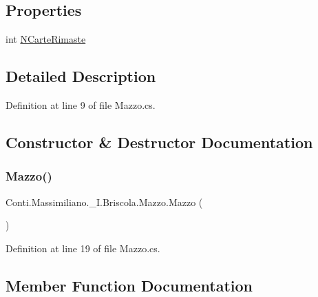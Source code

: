 \subsection*{Properties}
\begin{DoxyCompactItemize}
\item 
int \hyperlink{class_conti_1_1_massimiliano_1_1__5_i_1_1_briscola_1_1_mazzo_a2cf98bbfe46e4629a31e1a426c78eaf7}{N\+Carte\+Rimaste}
\end{DoxyCompactItemize}


\subsection{Detailed Description}


Definition at line 9 of file Mazzo.\+cs.



\subsection{Constructor \& Destructor Documentation}
\hypertarget{class_conti_1_1_massimiliano_1_1__5_i_1_1_briscola_1_1_mazzo_a14ec4b325dde5c862a8445d9b92a46e4}{}\label{class_conti_1_1_massimiliano_1_1__5_i_1_1_briscola_1_1_mazzo_a14ec4b325dde5c862a8445d9b92a46e4} 
\subsubsection{\texorpdfstring{Mazzo()}{Mazzo()}}
{\footnotesize\ttfamily Conti.\+Massimiliano.\+\_\+I.\+Briscola.\+Mazzo.\+Mazzo (\begin{DoxyParamCaption}{ }\end{DoxyParamCaption})}



Definition at line 19 of file Mazzo.\+cs.



\subsection{Member Function Documentation}
\hypertarget{class_conti_1_1_massimiliano_1_1__5_i_1_1_briscola_1_1_mazzo_ae4ea7e6f677aff31ff2bf322f6054083}{}\label{class_conti_1_1_massimiliano_1_1__5_i_1_1_briscola_1_1_mazzo_ae4ea7e6f677aff31ff2bf322f6054083} 
